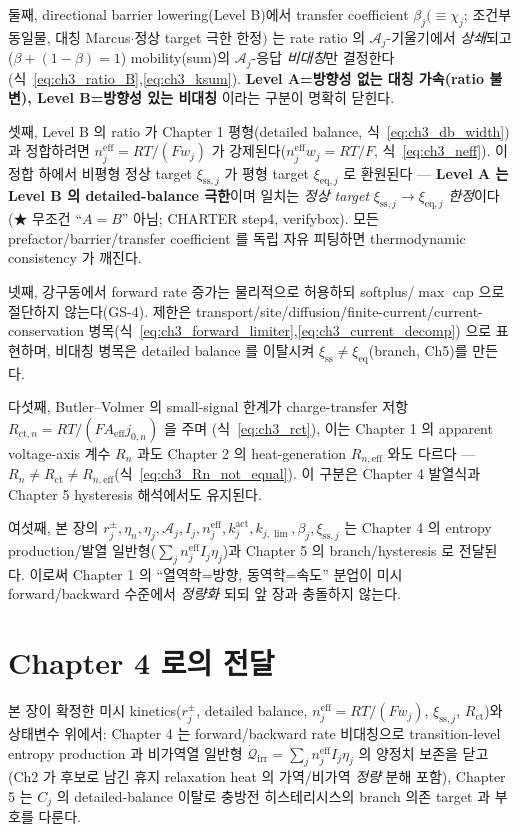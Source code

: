 \documentclass[11pt,a4paper]{article}
\newcommand{\eff}{\mathrm{eff}}
\newcommand{\eq}{\mathrm{eq}}
\newcommand{\irr}{\mathrm{irr}}
\newcommand{\ct}{\mathrm{ct}}
\newcommand{\sstat}{\mathrm{ss}}
\begin{document}
둘째, directional barrier lowering(Level B)에서 transfer coefficient $\beta_j(\equiv\chi_j$; 조건부 동일물, 대칭 Marcus$\cdot$정상 target 극한 한정$)$ 는 rate ratio 의
$\mathcal A_j$-기울기에서 \emph{상쇄}되고($\beta+(1-\beta)=1$) mobility(sum)의 $\mathcal A_j$-응답 \emph{비대칭}만
결정한다(식~\eqref{eq:ch3_ratio_B},\allowbreak\eqref{eq:ch3_ksum}). \textbf{Level A=방향성 없는 대칭 가속(ratio 불변),
Level B=방향성 있는 비대칭} 이라는 구분이 명확히 닫힌다.

셋째, Level B 의 ratio 가 Chapter 1 평형(detailed balance, 식~\eqref{eq:ch3_db_width})과 정합하려면
$n_j^{\eff}=RT/(Fw_j)$ 가 강제된다($n_j^{\eff}w_j=RT/F$, 식~\eqref{eq:ch3_neff}). 이 정합 하에서 비평형 정상 target
$\xi_{\sstat,j}$ 가 평형 target $\xi_{\eq,j}$ 로 환원된다 — \textbf{Level A 는 Level B 의 detailed-balance 극한}이며
일치는 \emph{정상 target} $\xi_{\sstat,j}\to\xi_{\eq,j}$ \emph{한정}이다(★ 무조건 ``$A=B$'' 아님; CHARTER step4,
verifybox). 모든 prefactor/barrier/transfer coefficient 를 독립 자유 피팅하면 thermodynamic consistency 가 깨진다.

넷째, 강구동에서 forward rate 증가는 물리적으로 허용하되 softplus/$\max$ cap 으로 절단하지 않는다(GS-4). 제한은
transport/site/diffusion/finite-current/current-conservation 병목(식~\eqref{eq:ch3_forward_limiter},\allowbreak\eqref{eq:ch3_current_decomp})
으로 표현하며, 비대칭 병목은 detailed balance 를 이탈시켜 $\xi_{\sstat}\ne\xi_{\eq}$(branch, Ch5)를 만든다.

다섯째, Butler--Volmer 의 small-signal 한계가 charge-transfer 저항 $R_{\ct,n}=RT/(FA_\eff j_{0,n})$ 을 주며
(식~\eqref{eq:ch3_rct}), 이는 Chapter 1 의 apparent voltage-axis 계수 $R_n$ 과도 Chapter 2 의 heat-generation
$R_{n,\eff}$ 와도 다르다 — \textbf{$R_n\ne R_\ct\ne R_{n,\eff}$}(식~\eqref{eq:ch3_Rn_not_equal}). 이 구분은
Chapter 4 발열식과 Chapter 5 hysteresis 해석에서도 유지된다.

여섯째, 본 장의 $r_j^\pm,\eta_n,\eta_j,\mathcal A_j,I_j,n_j^{\eff},k_j^{\mathrm{act}},k_{j,\lim},\beta_j,\xi_{\sstat,j}$ 는
Chapter 4 의 entropy production/발열 일반형($\sum_j n_j^{\eff}I_j\eta_j$)과 Chapter 5 의 branch/hysteresis 로
전달된다. 이로써 Chapter 1 의 ``열역학=방향, 동역학=속도'' 분업이 미시 forward/backward 수준에서 \emph{정량화}
되되 앞 장과 충돌하지 않는다.

\section*{Chapter 4 로의 전달}
본 장이 확정한 미시 kinetics($r_j^\pm$, detailed balance, $n_j^{\eff}=RT/(Fw_j)$, $\xi_{\sstat,j}$, $R_\ct$)와
상태변수 위에서: Chapter 4 는 forward/backward rate 비대칭으로 transition-level entropy production 과 비가역열
일반형 $\dot{\mathcal Q}_\irr=\sum_j n_j^{\eff}I_j\eta_j$ 의 양정치 보존을 닫고(Ch2 가 후보로 남긴 휴지
relaxation heat 의 가역/비가역 \emph{정량} 분해 포함), Chapter 5 는 $C_j$ 의 detailed-balance 이탈로 충방전
히스테리시스의 branch 의존 target 과 부호를 다룬다.
\end{document}
